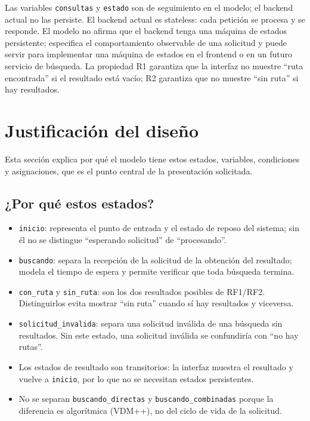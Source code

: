 \documentclass[11pt,a4paper]{article}
\begin{document}
Las variables \texttt{consultas} y \texttt{estado} son de seguimiento en el modelo; el backend actual no las persiste. El backend actual es stateless: cada petición se procesa y se responde. El modelo no afirma que el backend tenga una máquina de estados persistente; especifica el comportamiento observable de una solicitud y puede servir para implementar una máquina de estados en el frontend o en un futuro servicio de búsqueda. La propiedad R1 garantiza que la interfaz no muestre ``ruta encontrada'' si el resultado está vacío; R2 garantiza que no muestre ``sin ruta'' si hay resultados.

\section{Justificación del diseño}

Esta sección explica por qué el modelo tiene estos estados, variables, condiciones y asignaciones, que es el punto central de la presentación solicitada.

\subsection{¿Por qué estos estados?}

\begin{itemize}
  \item \texttt{inicio}: representa el punto de entrada y el estado de reposo del sistema; sin él no se distingue ``esperando solicitud'' de ``procesando''.
  \item \texttt{buscando}: separa la recepción de la solicitud de la obtención del resultado; modela el tiempo de espera y permite verificar que toda búsqueda termina.
  \item \texttt{con\_ruta} y \texttt{sin\_ruta}: son los dos resultados posibles de RF1/RF2. Distinguirlos evita mostrar ``sin ruta'' cuando sí hay resultados y viceversa.
  \item \texttt{solicitud\_invalida}: separa una solicitud inválida de una búsqueda sin resultados. Sin este estado, una solicitud inválida se confundiría con ``no hay rutas''.
  \item Los estados de resultado son transitorios: la interfaz muestra el resultado y vuelve a \texttt{inicio}, por lo que no se necesitan estados persistentes.
  \item No se separan \texttt{buscando\_directas} y \texttt{buscando\_combinadas} porque la diferencia es algorítmica (VDM++), no del ciclo de vida de la solicitud.
\end{itemize}
\end{document}
